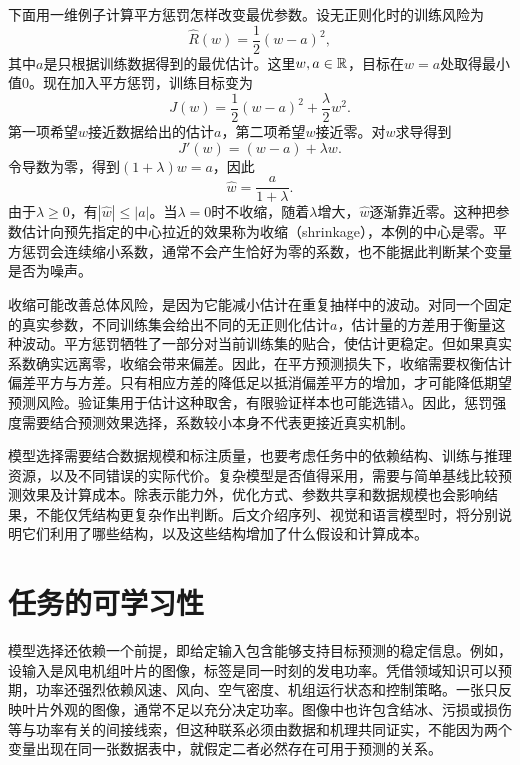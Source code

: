 下面用一维例子计算平方惩罚怎样改变最优参数。设无正则化时的训练风险为
\begin{equation}
 \hat R(w)=\frac12(w-a)^2,
\end{equation}
其中$a$是只根据训练数据得到的最优估计。这里$w,a\in\mathbb{R}$，目标在$w=a$处取得最小值$0$。现在加入平方惩罚，训练目标变为
\begin{equation}
 J(w)=\frac12(w-a)^2+\frac{\lambda}{2}w^2.
\end{equation}
第一项希望$w$接近数据给出的估计$a$，第二项希望$w$接近零。对$w$求导得到
\begin{equation}
 J'(w)=(w-a)+\lambda w.
\end{equation}
令导数为零，得到$(1+\lambda)w=a$，因此
\begin{equation}
 \hat w=\frac{a}{1+\lambda}.
\end{equation}
由于$\lambda\geq0$，有$|\hat w|\leq|a|$。当$\lambda=0$时不收缩，随着$\lambda$增大，$\hat w$逐渐靠近零。这种把参数估计向预先指定的中心拉近的效果称为收缩（shrinkage），本例的中心是零。平方惩罚会连续缩小系数，通常不会产生恰好为零的系数，也不能据此判断某个变量是否为噪声。

收缩可能改善总体风险，是因为它能减小估计在重复抽样中的波动。对同一个固定的真实参数，不同训练集会给出不同的无正则化估计$a$，估计量的方差用于衡量这种波动。平方惩罚牺牲了一部分对当前训练集的贴合，使估计更稳定。但如果真实系数确实远离零，收缩会带来偏差。因此，在平方预测损失下，收缩需要权衡估计偏差平方与方差。只有相应方差的降低足以抵消偏差平方的增加，才可能降低期望预测风险。验证集用于估计这种取舍，有限验证样本也可能选错$\lambda$。因此，惩罚强度需要结合预测效果选择，系数较小本身不代表更接近真实机制。

模型选择需要结合数据规模和标注质量，也要考虑任务中的依赖结构、训练与推理资源，以及不同错误的实际代价。复杂模型是否值得采用，需要与简单基线比较预测效果及计算成本。除表示能力外，优化方式、参数共享和数据规模也会影响结果，不能仅凭结构更复杂作出判断。后文介绍序列、视觉和语言模型时，将分别说明它们利用了哪些结构，以及这些结构增加了什么假设和计算成本。


\section{任务的可学习性}
模型选择还依赖一个前提，即给定输入包含能够支持目标预测的稳定信息。例如，设输入是风电机组叶片的图像，标签是同一时刻的发电功率。凭借领域知识可以预期，功率还强烈依赖风速、风向、空气密度、机组运行状态和控制策略。一张只反映叶片外观的图像，通常不足以充分决定功率。图像中也许包含结冰、污损或损伤等与功率有关的间接线索，但这种联系必须由数据和机理共同证实，不能因为两个变量出现在同一张数据表中，就假定二者必然存在可用于预测的关系。

